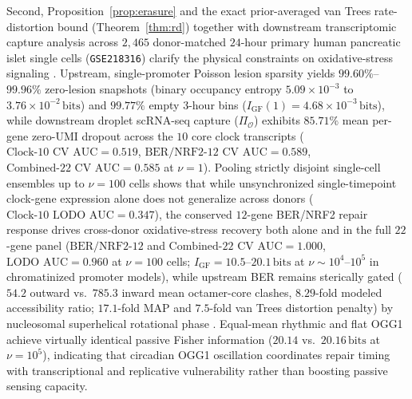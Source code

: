 \documentclass[10pt,letterpaper]{article}
\theoremstyle{plain}
\theoremstyle{definition}
\begin{document}
Second, Proposition~\ref{prop:erasure} and the exact prior-averaged van Trees rate-distortion bound (Theorem~\ref{thm:rd}) together with downstream transcriptomic capture analysis across $2{,}465$ donor-matched $24$-hour primary human pancreatic islet single cells (\texttt{GSE218316}) clarify the physical constraints on oxidative-stress signaling \cite{obermann2024redox,hahm2022emm,wang2025jbiomedsci,thomaidou2023diabetologia}. Upstream, single-promoter Poisson lesion sparsity yields $99.60\%$--$99.96\%$ zero-lesion snapshots (binary occupancy entropy $5.09 \times 10^{-3}$ to $3.76 \times 10^{-2}\,\mathrm{bits}$) and $99.77\%$ empty $3$-hour bins ($I_{\mathrm{GF}}(1) = 4.68 \times 10^{-3}\,\mathrm{bits}$), while downstream droplet scRNA-seq capture ($\Pi_{\mathcal{O}}$) exhibits $85.71\%$ mean per-gene zero-UMI dropout across the $10$ core clock transcripts ($\text{Clock-10 CV AUC} = 0.519$, $\text{BER/NRF2-12 CV AUC} = 0.589$, $\text{Combined-22 CV AUC} = 0.585$ at $\nu = 1$). Pooling strictly disjoint single-cell ensembles up to $\nu = 100$ cells shows that while unsynchronized single-timepoint clock-gene expression alone does not generalize across donors ($\text{Clock-10 LODO AUC} = 0.347$), the conserved $12$-gene BER/NRF2 repair response drives cross-donor oxidative-stress recovery both alone and in the full $22$-gene panel ($\text{BER/NRF2-12}$ and $\text{Combined-22 CV AUC} = 1.000$, $\text{LODO AUC} = 0.960$ at $\nu = 100$ cells; $I_{\mathrm{GF}} = 10.5$--$20.1\,\mathrm{bits}$ at $\nu \sim 10^4$--$10^5$ in chromatinized promoter models), while upstream BER remains sterically gated ($54.2$ outward vs.\ $785.3$ inward mean octamer-core clashes, $8.29$-fold modeled accessibility ratio; $17.1$-fold MAP and $7.5$-fold van Trees distortion penalty) by nucleosomal superhelical rotational phase \cite{cordero2024natcommun,ren2024natcommun,li2025nar}. Equal-mean rhythmic and flat OGG1 achieve virtually identical passive Fisher information ($20.14$ vs.\ $20.16\,\mathrm{bits}$ at $\nu = 10^5$), indicating that circadian OGG1 oscillation coordinates repair timing with transcriptional and replicative vulnerability rather than boosting passive sensing capacity.
\end{document}
